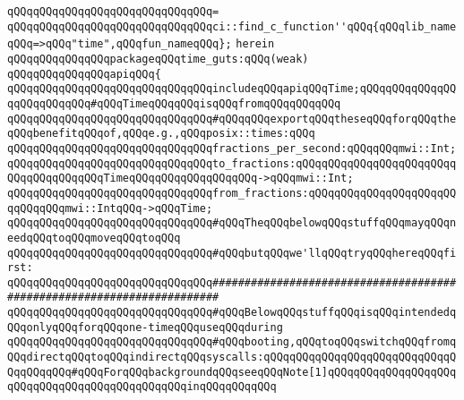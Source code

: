 \verb|qQQqqQQqqQQqqQQqqQQqqQQqqQQqqQQq=|\newline
\verb|qQQqqQQqqQQqqQQqqQQqqQQqqQQqqQQqci::find_c_function''qQQq{qQQqlib_nameqQQq=>qQQq"time",qQQqfun_nameqQQq};|\newline
\verb|herein|\newline
\newline
\verb|qQQqqQQqqQQqqQQqpackageqQQqtime_guts:qQQq(weak)|\newline
\verb|qQQqqQQqqQQqqQQqapiqQQq{|\newline
\verb|qQQqqQQqqQQqqQQqqQQqqQQqqQQqqQQqincludeqQQqapiqQQqTime;qQQqqQQqqQQqqQQqqQQqqQQqqQQq#qQQqTimeqQQqqQQqisqQQqfromqQQqqQQqqQQq|\newline
\newline
\verb|qQQqqQQqqQQqqQQqqQQqqQQqqQQqqQQq#qQQqqQQqexportqQQqtheseqQQqforqQQqtheqQQqbenefitqQQqof,qQQqe.g.,qQQqposix::times:qQQq|\newline
\newline
\verb|qQQqqQQqqQQqqQQqqQQqqQQqqQQqqQQqfractions_per_second:qQQqqQQqmwi::Int;|\newline
\verb|qQQqqQQqqQQqqQQqqQQqqQQqqQQqqQQqto_fractions:qQQqqQQqqQQqqQQqqQQqqQQqqQQqqQQqqQQqqQQqTimeqQQqqQQqqQQqqQQqqQQq->qQQqmwi::Int;|\newline
\verb|qQQqqQQqqQQqqQQqqQQqqQQqqQQqqQQqfrom_fractions:qQQqqQQqqQQqqQQqqQQqqQQqqQQqqQQqmwi::IntqQQq->qQQqTime;|\newline
\newline
\newline
\verb|qQQqqQQqqQQqqQQqqQQqqQQqqQQqqQQq#qQQqTheqQQqbelowqQQqstuffqQQqmayqQQqneedqQQqtoqQQqmoveqQQqtoqQQq|\newline
\verb|qQQqqQQqqQQqqQQqqQQqqQQqqQQqqQQq#qQQqbutqQQqwe'llqQQqtryqQQqhereqQQqfirst:|\newline
\verb|qQQqqQQqqQQqqQQqqQQqqQQqqQQqqQQq#######################################################################|\newline
\verb|qQQqqQQqqQQqqQQqqQQqqQQqqQQqqQQq#qQQqBelowqQQqstuffqQQqisqQQqintendedqQQqonlyqQQqforqQQqone-timeqQQquseqQQqduring|\newline
\verb|qQQqqQQqqQQqqQQqqQQqqQQqqQQqqQQq#qQQqbooting,qQQqtoqQQqswitchqQQqfromqQQqdirectqQQqtoqQQqindirectqQQqsyscalls:qQQqqQQqqQQqqQQqqQQqqQQqqQQqqQQqqQQqqQQq#qQQqForqQQqbackgroundqQQqseeqQQqNote[1]qQQqqQQqqQQqqQQqqQQqqQQqqQQqqQQqqQQqqQQqqQQqqQQqinqQQqqQQqqQQq|\newline
